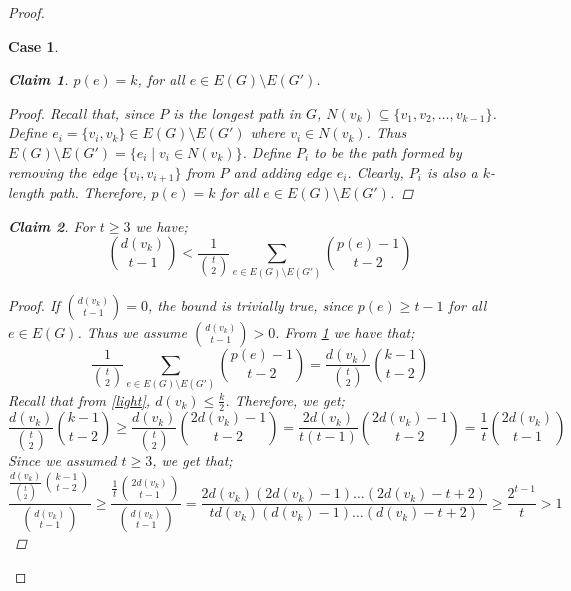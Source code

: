 \documentclass[pdflatex,sn-basic,Numbered]{sn-jnl}
\newtheorem{cl}{Claim}
\newtheorem{case}{Case}
\begin{document}
\begin{proof}
\begin{case}
    \begin{cl}\label{claim3.6}
        $p(e) = k$, for all $e \in E(G)\setminus E(G')$.
    \end{cl}
    \begin{proof}
            Recall that, since $P$ is the longest path in $G$, $N(v_k) \subseteq \{v_1,v_2,\dots,v_{k-1}\}$. Define $e_i = \{v_i,v_k\} \in E(G)\setminus E(G')$ where $v_i \in N(v_k)$. Thus $E(G)\setminus E(G') = \{e_i \mid v_i \in N(v_k)\}$. Define $P_i$ to be the path formed by removing the edge $\{v_i,v_{i+1}\}$ from $P$ and adding edge $e_i$. Clearly, $P_i$ is also a $k$-length path. Therefore, $p(e) = k$ for all $e \in E(G)\setminus E(G')$.
         \end{proof}
    \begin{cl}\label{claim3.7} For $t \geq 3$ we have;
        \begin{equation*}
            {d(v_k) \choose t-1}< \frac{1}{{t\choose 2}}\sum_{e \in E(G) \setminus E(G')}{{p(e)-1\choose t-2}} 
        \end{equation*}
    \end{cl}
\begin{proof}
        If ${d(v_k)\choose t-1} = 0$, the bound is trivially true, since $p(e) \geq t-1$ for all $ e\in E(G)$. Thus we assume ${d(v_k) \choose t-1} > 0$. From \cref{claim3.6} we have that;
        \begin{equation*}
            \frac{1}{{t\choose 2}}\sum_{e \in E(G) \setminus E(G')}{{p(e)-1\choose t-2}} = \frac{d(v_k)}{{t\choose 2}}{k-1 \choose t-2}
        \end{equation*}
            Recall that from \cref{light}, $d(v_k) \leq \frac{k}{2}$. Therefore, we get;
            \begin{equation*}
               \frac{d(v_k)}{{t\choose 2}}{k-1\choose t-2} \geq \frac{d(v_k)}{{t\choose 2}}{2d(v_k)-1\choose t-2} = \frac{2d(v_k)}{t(t-1)}{2d(v_k)-1\choose t-2} = \frac{1}{t}{2d(v_k)\choose t-1}
            \end{equation*}
            Since we assumed $t \geq 3$, we get that;
            \begin{equation*}
                \frac{\frac{d(v_k)}{{t\choose 2}}{k-1\choose t-2}}{{d(v_k)\choose t-1}} \geq \frac{\frac{1}{t}{2d(v_k)\choose t-1}}{{d(v_k)\choose t-1}} = \frac{2d(v_k)(2d(v_k)-1)\dots(2d(v_k)-t+2)}{td(v_k)(d(v_k)-1)\dots(d(v_k)-t+2)}\geq \frac{2^{t-1}}{t}> 1
            \end{equation*}
         \end{proof}
    

\end{case}
\end{proof}
\end{document}
